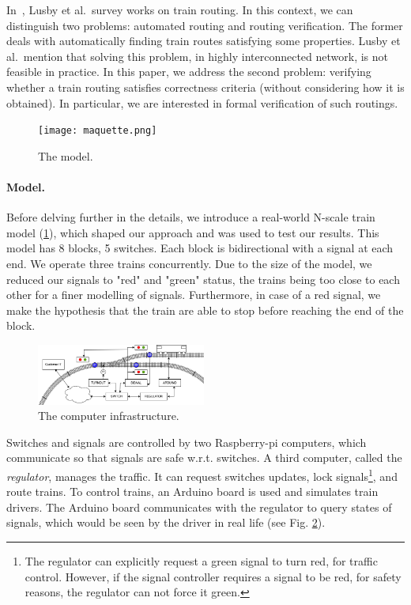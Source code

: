 \documentclass[runningheads]{llncs}
\begin{document}
In~\cite{lusby_railway_2011}, Lusby et al.\ survey works on train routing. In this context, we can distinguish two problems: automated routing and routing verification. The former deals with automatically finding train routes satisfying some properties. Lusby et al.\ mention that solving this problem, in highly interconnected network, is not feasible in practice. In this paper, we address the second problem: verifying whether a train routing satisfies correctness criteria (without considering how it is obtained). In particular, we are interested in formal verification of such routings.

\begin{figure}
	\begin{minipage}{0.28\textwidth}
		\centering
		\vspace{-8mm}
		\texttt{[image: maquette.png]}
		\caption{The model.}
		\label{fig:maquette}
	\end{minipage}
\end{figure}

\paragraph{Model.}
Before delving further in the details, we introduce a real-world N-scale train model (\ref{fig:maquette}), which shaped our approach and was used to test our results. This model has 8 blocks, 5 switches. Each block is bidirectional with a signal at each end. %
 We operate three trains concurrently. Due to the size of the model, we reduced our signals  to "red" and "green" status, the trains being too close to each other for a finer modelling of signals. Furthermore, in case of a red signal, we make the hypothesis that the train are able to stop before reaching the end of the block.

\begin{figure}
	\vspace{-6mm}
	\includegraphics[height=20mm]{TrainSchema.png}
	\caption{The computer infrastructure.}
	\label{fig:computers}
\end{figure}

Switches and signals are controlled by two Raspberry-pi computers, which communicate so that signals are safe w.r.t. switches. A third computer, called the \emph{regulator}, manages the traffic. It can request switches updates, lock signals\footnote{The regulator can explicitly request a green signal to turn red, for traffic control. However, if the signal controller requires a signal to be red, for safety reasons, the regulator can not force it green.}, and route trains. To control trains, an Arduino board is used and simulates train drivers. The Arduino board communicates with the regulator to query states of signals, which would be seen by the driver in real life (see Fig. \ref{fig:computers}). 
\end{document}
